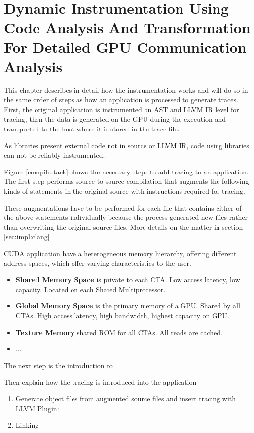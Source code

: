 \chapter{Dynamic Instrumentation Using Code Analysis And Transformation For Detailed GPU Communication Analysis}
This chapter describes in detail how the instrumentation works and will do so in the same order of steps as how an application is processed to generate traces.
First, the original application is instrumented on AST and LLVM IR level for tracing, then the data is generated on the GPU during the execution and transported to the host where it is stored in the trace file.

As libraries present external code not in source or LLVM IR, code using libraries can not be reliably instrumented.

Figure \ref{compilestack} shows the necessary steps to add tracing to an application. The first step performs source-to-source compilation that augments the following kinds of statements in the original source with instructions required
for tracing.

These augmentations have to be performed for each file that contains either of the above statements individually because the process generated new files
rather than overwriting the original source files. More details on the matter in section \ref{sec:impl:clang}


CUDA application have a heterogeneous memory hierarchy, offering different address spaces, which offer varying characteristics to the user.

\begin{itemize}
	\item \textbf{Shared Memory Space} is private to each CTA. Low access latency, low capacity. Located on each Shared Multiprocessor.
	\item \textbf{Global Memory Space} is the primary memory of a GPU. Shared by all CTAs. High access latency, high bandwidth, highest capacity on GPU.
	\item \textbf{Texture Memory} shared ROM for all CTAs. All reads are cached.
	\item  ...
\end{itemize}



The next step is the introduction to 

Then explain how the tracing is introduced into the application
\begin{enumerate}
	\item Generate object files from augmented source files and insert tracing with LLVM Plugin:
	\item Linking
\end{enumerate}


